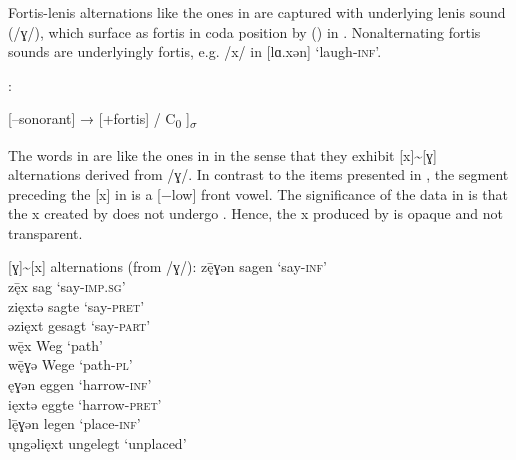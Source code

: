 Fortis-lenis alternations like the ones in  are captured with underlying lenis sound (/ɣ/), which surface as fortis in coda position by  () in . Nonalternating fortis sounds are underlyingly fortis, e.g. /x/ in [lɑ.xən] ‘laugh-\textsc{inf}’.

\ea%
    \label{ex:5:8}
          :

[--sonorant] → [+fortis] / {\longrule} C\textsubscript{0} ]\textsubscript{${\sigma}$}

\z 

The words in  are like the ones in  in the sense that they exhibit [x]{\textasciitilde}[ɣ] alternations derived from /ɣ/. In contrast to the items presented in , the segment preceding the [x] in  is a [−low] front vowel. The significance of the data in  is that the {\textbar}x{\textbar} created by  does not undergo . Hence, the {\textbar}x{\textbar} produced by  is opaque and not transparent.


\ea%
    \label{ex:5:9}
           [ɣ]{\textasciitilde}[x] alternations (from /ɣ/):
\ea\label{ex:5:9a} 
z\={ę}ɣən  \tab sagen  \tab ‘say-\textsc{inf}’             \\
z\={ę}x   \tab  [zɛːx]    \tab sag    \tab ‘say-\textsc{imp}.\textsc{sg}’ \\
zięxtə    \tab [ziɛx.tə]  \tab sagte  \tab ‘say-\textsc{pret}’           \\
əzięxt    \tab [əziɛxt]   \tab gesagt \tab  ‘say-\textsc{part}’          \\

\ex \label{ex:5:9b}
w\={ę}x   \tab [βɛːx]   \tab Weg  \tab ‘path’   \\
w\={ę}ɣə  \tab [βɛː.ɣə] \tab Wege \tab  ‘path-\textsc{pl}’ \\

\ex \label{ex:5:9c}
ęɣən  \tab [ɛ.ɣən]  \tab eggen   \tab ‘harrow-\textsc{inf}’      \\
ięxtə \tab [iɛx.tə] \tab  eggte  \tab  ‘harrow-\textsc{pret}’  \\

\ex\label{ex:5:9d}
l\={ę}ɣən       \tab legen     \tab ‘place-\textsc{inf}’  \\
\k{u}ngǝlięxt \tab [ʊngǝliɛxt] \tab  ungelegt \tab ‘unplaced’            \\

